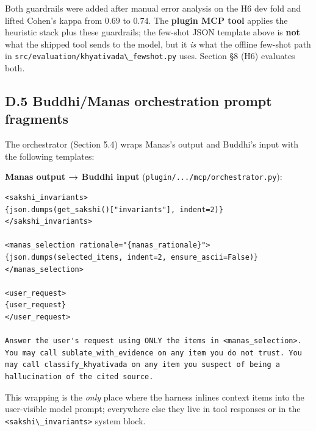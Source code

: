 Both guardrails were added after manual error analysis on the H6
dev fold and lifted Cohen's kappa from \(0.69\) to \(0.74\). The \textbf{plugin MCP tool} applies the heuristic stack plus these guardrails; the few-shot JSON template above is \textbf{not} what the shipped tool sends to the model, but it \emph{is} what the offline few-shot path in \passthrough{\lstinline!src/evaluation/khyativada\_fewshot.py!} uses. Section §8 (H6) evaluates both.

\subsection{D.5 Buddhi/Manas orchestration prompt fragments}\label{d.5-buddhimanas-orchestration-prompt-fragments}

The orchestrator (Section 5.4) wraps Manas's output and Buddhi's input
with the following templates:

\textbf{Manas output → Buddhi input} (\passthrough{\lstinline!plugin/.../mcp/orchestrator.py!}):

\begin{lstlisting}
<sakshi_invariants>
{json.dumps(get_sakshi()["invariants"], indent=2)}
</sakshi_invariants>

<manas_selection rationale="{manas_rationale}">
{json.dumps(selected_items, indent=2, ensure_ascii=False)}
</manas_selection>

<user_request>
{user_request}
</user_request>

Answer the user's request using ONLY the items in <manas_selection>.
You may call sublate_with_evidence on any item you do not trust. You
may call classify_khyativada on any item you suspect of being a
hallucination of the cited source.
\end{lstlisting}

This wrapping is the \emph{only} place where the harness inlines context items
into the user-visible model prompt; everywhere else they live in tool
responses or in the \passthrough{\lstinline!<sakshi\_invariants>!} system block.
